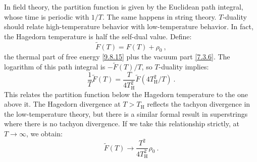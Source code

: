 In field theory, the partition function is given by the Euclidean path integral, whose time is periodic with $1 / T$. The same happens in string theory. $T$-duality should relate high-temperature behavior with low-temperature behavior. 
In fact, the Hagedorn temperature is half the self-dual value.
Define:
\begin{equation}
	\tilde{F}(T)=F(T)+\rho_{0} \:, \label{9.8.18}
\end{equation}
the thermal part of free energy \eqref{9.8.15} plus the vacuum part \eqref{7.3.6}. The logarithm of this path integral is $-\tilde{F}(T) / T$, so $T$-duality implies:
\begin{equation}
	\frac{1}{T} \tilde{F}(T)=\frac{T}{4 T_{\mathrm{H}}^{2}} \tilde{F}(4 T_{\mathrm{H}}^{2} / T) \:. \label{9.8.19}
\end{equation}
This relates the partition function below the Hagedorn temperature to the one above it.
The Hagedorn divergence at $T>T_{\mathrm{H}}$ reflects the tachyon divergence in the low-temperature theory, 
but there is a similar formal result in superstrings where there is no tachyon divergence. If we take this relationship strictly, at $T \rightarrow \infty $, we obtain:
\begin{equation}
	\tilde{F}(T) \rightarrow \frac{T^{2}}{4 T_{\mathrm{H}}^{2}} \rho_{0} \:. \label{9.8.20}
\end{equation}
